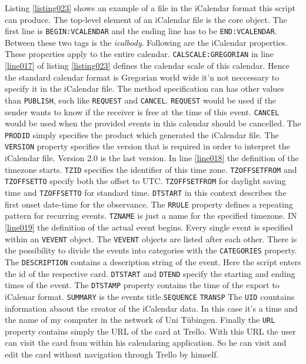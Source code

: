 Listing \ref{listing023} shows an example of a file in the iCalendar format this script can produce. The top-level element of an iCalendar file is the core object. The first line is \lstinline{BEGIN:VCALENDAR} and the ending line has to be \lstinline{END:VCALENDAR}. Between these two tags is the \emph{icalbody}. Following are the iCalendar properties. These properties apply to the entire calendar. \lstinline{CALSCALE:GREGORIAN} in line \ref{line017} of listing \ref{listing023} defines the calendar scale of this calendar. Hence the standard calendar format is Gregorian world wide it'n not neccessary to specify it in the iCalendar file. The method specification can has other values than \lstinline{PUBLISH}, such like \lstinline{REQUEST} and \lstinline{CANCEL}. \lstinline{REQUEST} would be used if the sender wants to know if the receiver is free at the time of this event. \lstinline{CANCEL} would be used when the provided events in this calendar should be cancelled. The \lstinline{PRODID} simply specifies the product which generated the iCalendar file. The \lstinline{VERSION} property specifies the version that is required in order to interpret the iCalendar file. Version 2.0 is the last version. In line \ref{line018} the definition of the timezone starts. \lstinline{TZID} specifies the identifier of this time zone. \lstinline{TZOFFSETFROM} and \lstinline{TZOFFSETTO} specify both the offset to UTC. \lstinline{TZOFFSETFROM} for daylight saving time and \lstinline{TZOFFSETTO} for standard time. \lstinline{DTSTART} in this context describes the first onset date-time for the observance. The \lstinline{RRULE} property defines a repeating pattern for recurring events. \lstinline{TZNAME} is just a name for the specified timezone. IN \ref{line019} the definition of the actual event begins. Every single event is specified within an \lstinline{VEVENT} object. The \lstinline{VEVENT} objects are listed after each other. There is the possibility to divide the events into categories with the \lstinline{CATEGORIES} property. The \lstinline{DESCRIPTION} contains a description string of the event. Here the script enters the id of the respective card. \lstinline{DTSTART} and \lstinline{DTEND} specify the starting and ending times of the event. The \lstinline{DTSTAMP} property contains the time of the export to iCalenar format. \lstinline{SUMMARY} is the events title.\lstinline{SEQUENCE} \lstinline{TRANSP} The \lstinline{UID} countains information abaout the creator of the iCalendar data. In this case it's a time and the name of my computer in the network of Uni Tübingen. Finally the \lstinline{URL} property contains simply the URL of the card at Trello. With this URL the user can visit the card from within his calendaring application. So he can visit and edit the card without navigation through Trello by himself.  

